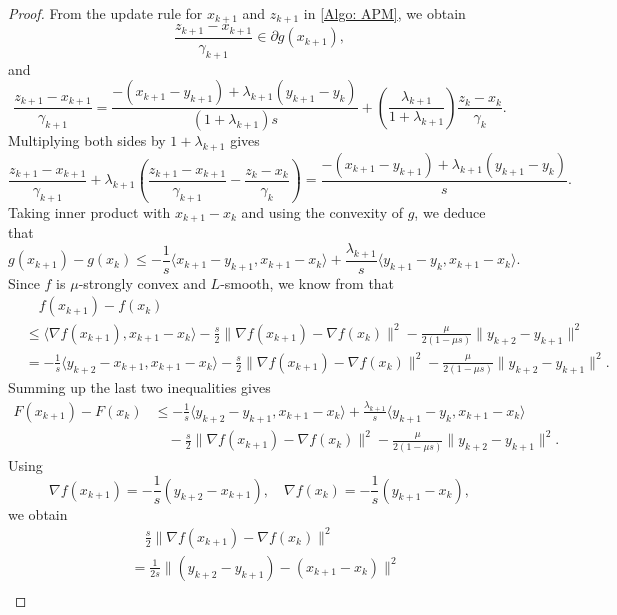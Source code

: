 \documentclass[pdflatex,sn-mathphys-num]{sn-jnl}
\theoremstyle{thmstyleone}
\theoremstyle{thmstyletwo}
\theoremstyle{thmstylethree}
\begin{document}
\begin{proof}
From the update rule for $x_{k+1}$ and $z_{k+1}$ in \eqref{Algo: APM}, we obtain
$$ \frac{z_{k+1} - x_{k+1}}{\gamma_{k+1}} \in \partial g(x_{k+1}), $$
and
\begin{equation}\label{E: subgradient_iterate}
\frac{z_{k+1}-x_{k+1}}{\gamma_{k+1}} 
= \frac{ -(x_{k+1}-y_{k+1}) + \lambda_{k+1} (y_{k+1}-y_k) }{(1 + \lambda_{k+1})s} + \left( \frac{\lambda_{k+1}}{1 + \lambda_{k+1}} \right) \frac{z_k-x_k}{\gamma_k}.
\end{equation}
Multiplying both sides by $1+\lambda_{k+1}$ gives
\begin{equation}\label{E: iterates}
\frac{z_{k+1} - x_{k+1}}{\gamma_{k+1}} + \lambda_{k+1} \left( \frac{z_{k+1} - x_{k+1}}{\gamma_{k+1}} - \frac{z_k-x_k}{\gamma_k} \right)  
= \frac{-(x_{k+1}-y_{k+1}) + \lambda_{k+1} (y_{k+1}-y_k)}{s}.
\end{equation}
Taking inner product with $x_{k+1}-x_k$ and using the convexity of $g$, we deduce that
$$ g(x_{k+1}) - g(x_k) \le - \frac{1}{s} \langle x_{k+1}-y_{k+1}, x_{k+1} - x_k \rangle + \frac{\lambda_{k+1}}{s} \langle y_{k+1}-y_k, x_{k+1} - x_k \rangle.  $$
Since $f$ is $\mu$-strongly convex and $L$-smooth, we know from \cite[Theorem 4]{Talor_2017_SC} that
\begin{align*}
&\quad f(x_{k+1}) - f(x_k) \\ 
&\le \langle \nabla f(x_{k+1}), x_{k+1} - x_k \rangle - \frac{s}{2}\| \nabla f(x_{k+1}) - \nabla f(x_k) \|^2 - \frac{\mu}{2(1-\mu s)}\| y_{k+2} - y_{k+1} \|^2\\
&= -\frac{1}{s} \langle y_{k+2}-x_{k+1}, x_{k+1} - x_k \rangle - \frac{s}{2}\| \nabla f(x_{k+1}) - \nabla f(x_k) \|^2 - \frac{\mu}{2(1-\mu s)}\| y_{k+2} - y_{k+1} \|^2.
\end{align*}
Summing up the last two inequalities gives
\begin{align*}
F(x_{k+1}) - F(x_k)   
&\le -\frac{1}{s} \langle y_{k+2}-y_{k+1}, x_{k+1} - x_k \rangle + \frac{\lambda_{k+1}}{s} \langle y_{k+1}-y_k, x_{k+1} - x_k \rangle \\
&\quad - \frac{s}{2}\| \nabla f(x_{k+1}) - \nabla f(x_k) \|^2
       - \frac{\mu}{2(1-\mu s)}\| y_{k+2} - y_{k+1} \|^2. 
\end{align*}
Using
$$ \nabla f(x_{k+1}) = -\frac{1}{s}(y_{k+2}-x_{k+1}),\quad \nabla f(x_k) = -\frac{1}{s}(y_{k+1}-x_k), $$
we obtain
\begin{align*}
&\quad \frac{s}{2}\| \nabla f(x_{k+1}) - \nabla f(x_k) \|^2 \\
&= \frac{1}{2s} \| (y_{k+2} - y_{k+1}) - (x_{k+1} - x_k) \|^2 \\

\end{align*}
\end{proof}
\end{document}
